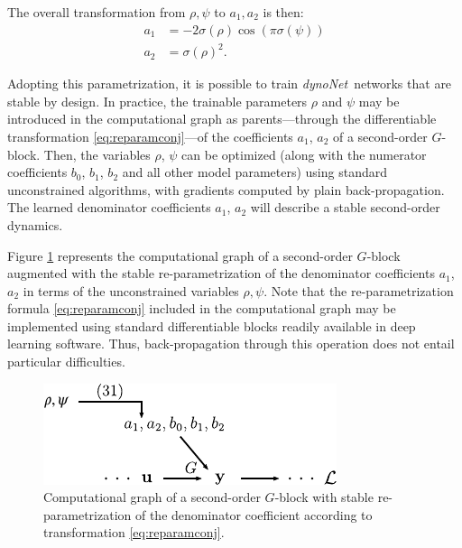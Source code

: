 \documentclass{article}
\newcommand{\ac}{a} %
\newcommand{\Name}{\emph{dynoNet}}
\begin{document}
The overall transformation from $\rho, \psi$ to $\ac_1, \ac_2$ is then:
\begin{subequations}
	\label{eq:reparamconj}
	\begin{align}
	\ac_1 &= - 2\sigma(\rho) \cos(\pi \sigma(\psi))\\
	\ac_2 &= \sigma(\rho)^2.
	\end{align}
\end{subequations}

Adopting this parametrization,  it is possible to train \Name\ networks that are stable by design. In practice, the trainable parameters $\rho$ and $\psi$ may be introduced in the computational graph as parents---through the differentiable transformation \eqref{eq:reparamconj}---of the coefficients $a_1$, $a_2$ of a second-order $G$-block. 
Then, the variables $\rho$, $\psi$ can be optimized (along with the numerator coefficients $b_0$, $b_1$, $b_2$ and all other 
model parameters) using standard unconstrained algorithms, with gradients computed by plain back-propagation.
The learned denominator coefficients $a_1$, $a_2$ will describe a stable second-order dynamics. %

Figure \ref{fig:backprop_tf_ab_stable_mod} represents  the computational graph of a second-order $G$-block augmented with the 
stable re-parametrization of the denominator coefficients $a_1$, $a_2$ in terms of the unconstrained variables $\rho, \psi$.
Note that the re-parametrization formula \eqref{eq:reparamconj} included in the computational graph may be implemented 
using standard differentiable blocks readily  available in deep learning software. Thus, back-propagation 
through this operation does not entail particular difficulties.


\begin{figure}[h]
	\begin{center}
		
		\includegraphics[width=.35\textwidth]
		{fig/backprop_tf_ab_stable_mod.pdf}
	\end{center}
	\caption{Computational graph of a second-order $G$-block with stable re-parametrization of the denominator coefficient 
	according to transformation \eqref{eq:reparamconj}.}
	\label{fig:backprop_tf_ab_stable_mod}
\end{figure} 
\end{document}
